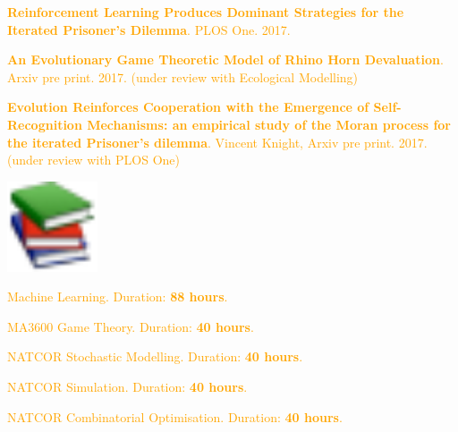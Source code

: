 \documentclass{beamer}
\newcommand{\cmark}{\ding{51}}%
\newcommand{\done}{\rlap{$\square$}{\raisebox{2pt}{\large\hspace{1pt}\cmark}}%
\hspace{-2.5pt}}
\begin{document}
\begin{frame}
\small{
    \begin{center}
    \textcolor{orange}{
    \begin{todolist}
    \item[\done] \textbf{Reinforcement Learning Produces Dominant Strategies for the Iterated
    Prisoner's Dilemma}. PLOS One. 2017.
    \item \textbf{An Evolutionary Game Theoretic Model of Rhino Horn Devaluation}.
    Arxiv pre print. 2017. (under review with Ecological Modelling)
    \item \textbf{Evolution Reinforces Cooperation with the Emergence of Self-Recognition Mechanisms: an empirical study of the Moran process for the iterated Prisoner's dilemma}. Vincent Knight,
    Arxiv pre print. 2017. (under review with PLOS One)
    \end{todolist}}
    \end{center}}
\end{frame}

\begin{frame}
    \begin{center}
    \includegraphics[width=0.20\textwidth]{static/learn.pdf}
    \end{center}
\end{frame}

\begin{frame}
    \begin{center}
    \textcolor{orange}{
    \begin{todolist}
        \item[\done] Machine Learning. Duration: \textbf{88 hours}.
        \item[\done] MA3600 Game Theory. Duration: \textbf{40 hours}.
        \item[\done] NATCOR Stochastic Modelling. Duration: \textbf{40 hours}.
        \item[\done] NATCOR Simulation. Duration: \textbf{40 hours}.
        \item[\done] NATCOR Combinatorial Optimisation. Duration: \textbf{40 hours}.
      \end{todolist}}
    \end{center}
\end{frame}
\end{document}
